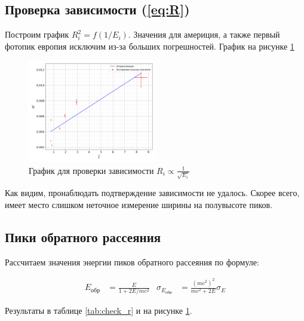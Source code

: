 \documentclass[a4paper, 12pt]{article}
\begin{document}
        \subsection{Проверка зависимости (\ref{eq:R})}

            Построим график $R_i^2 = f(1/E_i)$. Значения для америция, а также первый фотопик европия исключим из-за больших погрешностей. График на рисунке \ref{plot:check_r}

            \begin{figure}[ht!]
                \begin{center}
                    \includegraphics[width = 0.5\textwidth]{img/plot_r.png}
                    \caption{График для проверки зависимости $R_i \propto \frac{1}{\sqrt{E_i}}$}
                    \label{plot:check_r}
                \end{center}
            \end{figure}

            Как видим, пронаблюдать подтверждение зависимости не удалось. Скорее всего, имеет место слишком неточное измерение ширины на полувысоте пиков.

        \subsection{Пики обратного рассеяния}

            Рассчитаем значения энергии пиков обратного рассеяния по формуле:

            \begin{align*}
                E_{обр} &= \frac{E}{1 + 2E/mc^2} & \sigma_{E_{обр}} &= \frac{(mc^2)^2}{mc^2 + 2E} \sigma_E
            \end{align*}

            Результаты в таблице \ref{tab:check_r} и на рисунке \ref{plot:check_r}.
\end{document}
